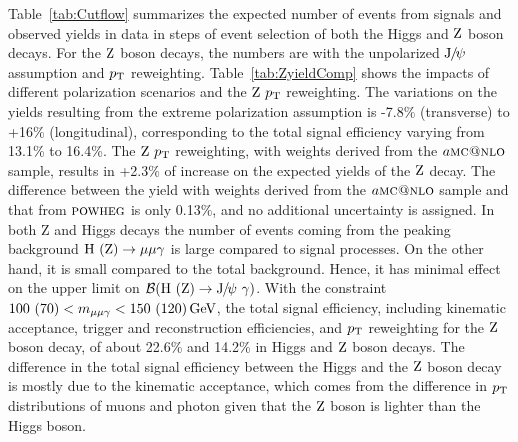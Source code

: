 		Table~\ref{tab:Cutflow} summarizes the expected number of events from signals and observed yields in data in steps of event selection of both the Higgs and $\mathrm{Z}$ boson decays. For the $\mathrm{Z}$ boson decays, the numbers are with the unpolarized ${\mathrm{J}\hspace{-.08em}/\hspace{-.14em}\psi}$ assumption and $p_{\mathrm{T}}$ reweighting.
		Table~\ref{tab:ZyieldComp} shows the impacts of different polarization scenarios and the $\mathrm{Z}\ p_{\mathrm{T}}$ reweighting. The variations on the yields resulting from the extreme polarization assumption is -7.8$\%$ (transverse) to +16$\%$ (longitudinal), corresponding to the total signal efficiency varying from 13.1\% to 16.4\%.
	The $\mathrm{Z}\ p_{\mathrm{T}}$ reweighting, with weights derived from the $a\textsc{mc@nlo}$ sample, results in +2.3$\%$ of increase on the expected yields of the $\mathrm{Z}$ decay. The difference between the yield with weights derived from the $a\textsc{mc@nlo}$ sample and that from ${\textsc{powheg}}$ is only 0.13$\%$, and no additional uncertainty is assigned.
		In both Z and Higgs decays the number of events coming from the peaking background $\mathrm{H}\ (\mathrm{Z})\to\mu\mu\gamma$ is large compared to signal processes. On the other hand, it is small compared to the total background. Hence, it has minimal effect on the upper limit on $\mathcal{B}(\PH\ (\cPZ)\to\JPsi\ \gamma)$.
		With the constraint $100\ (70) < m_{\mu\mu\gamma} < 150\ (120)\GeV$, the total signal efficiency, including kinematic acceptance, trigger and reconstruction efficiencies, and $p_{\mathrm{T}}$ reweighting for the $\mathrm{Z}$ boson decay, of about 22.6\% and 14.2\% in Higgs and $\mathrm{Z}$ boson decays. 
		The difference in the total signal efficiency between the Higgs and the $\mathrm{Z}$ boson decay is mostly due to the kinematic acceptance, which comes from the difference in $p_{\mathrm{T}}$ distributions of muons and photon given that the $\mathrm{Z}$ boson is lighter than the Higgs boson.
		
